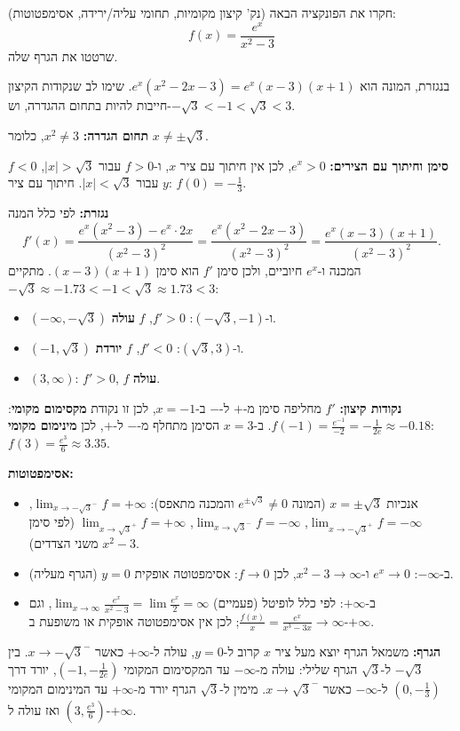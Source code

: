 
\begin{question}
חקרו את הפונקציה הבאה (נק' קיצון מקומיות, תחומי עליה/ירידה, אסימפטוטות):
\[ f(x)=\frac{e^x}{x^2-3} \]
שרטטו את הגרף שלה.
\end{question}

\begin{hint}
בנגזרת, המונה הוא $e^x(x^2-2x-3)=e^x(x-3)(x+1)$. שימו לב שנקודות הקיצון חייבות להיות בתחום ההגדרה, וש-$-\sqrt3<-1<\sqrt3<3$.
\end{hint}

\begin{solution}
\textbf{תחום הגדרה:} $x^2\neq3$, כלומר $x\neq\pm\sqrt3$.

\textbf{סימן וחיתוך עם הצירים:} $e^x>0$, לכן אין חיתוך עם ציר $x$, ו-$f>0$ עבור $|x|>\sqrt3$, $f<0$ עבור $|x|<\sqrt3$. חיתוך עם ציר $y$: $f(0)=-\frac13$.

\textbf{נגזרת:} לפי כלל המנה
\[ f'(x)=\frac{e^x(x^2-3)-e^x\cdot2x}{(x^2-3)^2}=\frac{e^x(x^2-2x-3)}{(x^2-3)^2}=\frac{e^x(x-3)(x+1)}{(x^2-3)^2}. \]
המכנה ו-$e^x$ חיוביים, ולכן סימן $f'$ הוא סימן $(x-3)(x+1)$. מתקיים $-\sqrt3\approx-1.73<-1<\sqrt3\approx1.73<3$:
\begin{itemize}
  \item $(-\infty,-\sqrt3)$ ו-$(-\sqrt3,-1)$: $f'>0$, $f$ \textbf{עולה}.
  \item $(-1,\sqrt3)$ ו-$(\sqrt3,3)$: $f'<0$, $f$ \textbf{יורדת}.
  \item $(3,\infty)$: $f'>0$, $f$ \textbf{עולה}.
\end{itemize}

\textbf{נקודות קיצון:} $f'$ מחליפה סימן מ-$+$ ל-$-$ ב-$x=-1$, לכן זו נקודת \textbf{מקסימום מקומי}: $f(-1)=\frac{e^{-1}}{-2}=-\frac1{2e}\approx-0.18$. ב-$x=3$ הסימן מתחלף מ-$-$ ל-$+$, לכן \textbf{מינימום מקומי}: $f(3)=\frac{e^3}{6}\approx3.35$.

\textbf{אסימפטוטות:}
\begin{itemize}
  \item אנכיות $x=\pm\sqrt3$ (המונה $e^{\pm\sqrt3}\neq0$ והמכנה מתאפס):
  $\lim_{x\to-\sqrt3^-}f=+\infty$, $\lim_{x\to-\sqrt3^+}f=-\infty$, $\lim_{x\to\sqrt3^-}f=-\infty$, $\lim_{x\to\sqrt3^+}f=+\infty$ (לפי סימן $x^2-3$ משני הצדדים).
  \item ב-$-\infty$: $e^x\to0$ ו-$x^2-3\to\infty$, לכן $f\to0$: אסימפטוטה אופקית $y=0$ (הגרף מעליה).
  \item ב-$+\infty$: לפי כלל לופיטל (פעמיים) $\lim_{x\to\infty}\frac{e^x}{x^2-3}=\lim\frac{e^x}{2}=\infty$, וגם $\frac{f(x)}{x}=\frac{e^x}{x^3-3x}\to\infty$; לכן אין אסימפטוטה אופקית או משופעת ב-$+\infty$.
\end{itemize}

\textbf{הגרף:} משמאל הגרף יוצא מעל ציר $x$ קרוב ל-$y=0$, עולה ל-$+\infty$ כאשר $x\to-\sqrt3^-$. בין $-\sqrt3$ ל-$\sqrt3$ הגרף שלילי: עולה מ-$-\infty$ עד המקסימום המקומי $(-1,-\frac1{2e})$, יורד דרך $(0,-\frac13)$ ל-$-\infty$ כאשר $x\to\sqrt3^-$. מימין ל-$\sqrt3$ הגרף יורד מ-$+\infty$ עד המינימום המקומי $(3,\frac{e^3}{6})$ ואז עולה ל-$+\infty$.
\end{solution}
